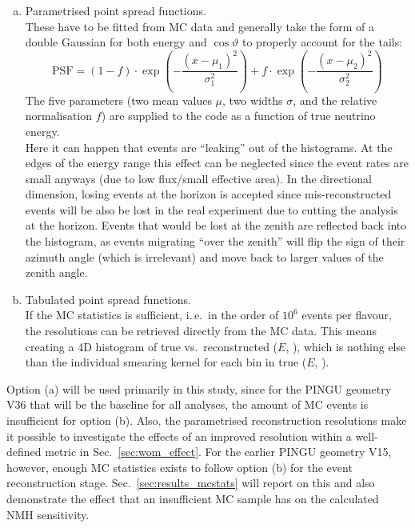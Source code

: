 \begin{enumerate}[(a)]
 \item Parametrised point spread functions.\\ These have to be fitted from MC
  data and generally take the form of a double Gaussian for both energy and
  $\cos\vartheta$ to properly account for the tails:
  \begin{equation}
   \mathrm{PSF} = (1-f)\cdot \exp\left(-\frac{(x-\mu_1)^2}{\sigma_1^2}\right)
                  + f\cdot \exp\left(-\frac{(x-\mu_2)^2}{\sigma_2^2}\right)
   \label{eqn:reco_param}
  \end{equation}
  The five parameters (two mean values $\mu$, two widths $\sigma$, and the
  relative normalisation $f$) are supplied to the code as a function of true
  neutrino energy.\\
  Here it can happen that events are ``leaking'' out of the histograms. At
  the edges of the energy range this effect can be neglected since the event
  rates are small anyways (due to low flux/small effective area). In the
  directional dimension, losing events at the horizon is accepted since
  mis-reconstructed events will be also be lost in the real experiment due to
  cutting the analysis at the horizon. Events that would be lost at the zenith
  are reflected back into the histogram, as events migrating ``over the
  zenith'' will flip the sign of their azimuth angle (which is irrelevant) and
  move back to larger values of the zenith angle.
 \item Tabulated point spread functions.\\ If the MC statistics is sufficient,
  i.\,e.\ in the order of $10^6$ events per flavour, the resolutions can be
  retrieved directly from the MC data. This means creating a 4D histogram of
  true vs.\ reconstructed ($E$, \coszen), which is nothing else than
  the individual smearing kernel for each bin in true ($E$, \coszen).
  \end{enumerate}
Option (a) will be used primarily in this study, since for the PINGU geometry
V36 that will be the baseline for all analyses, the amount of MC events is
insufficient for option (b). Also, the parametrised reconstruction resolutions
make it possible to investigate the effects of an improved resolution within a
well-defined metric in Sec.~\ref{sec:wom_effect}.
For the earlier PINGU geometry V15, however, enough MC statistics exists to
follow option (b) for the event reconstruction stage.
Sec.~\ref{sec:results_mcstats} will report on this and also demonstrate the
effect that an insufficient MC sample has on the calculated NMH sensitivity.

